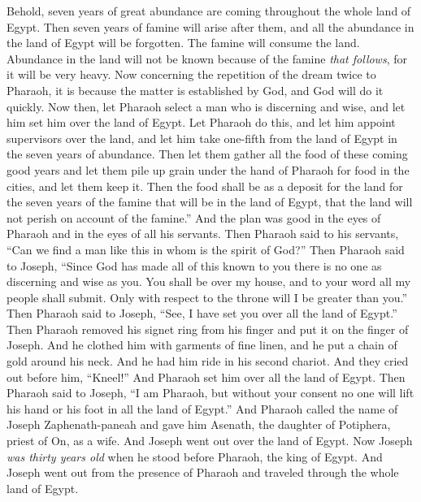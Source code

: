 \begin{biblechapter}
\verse Behold, seven years of great abundance are coming throughout the whole land of Egypt.
\verse Then seven years of famine will arise after them, and all the abundance in the land of Egypt will be forgotten. The famine will consume the land.
\verse Abundance in the land will not be known because of the famine \textit{that follows}, for it will be very heavy.
\verse Now concerning the repetition of the dream twice to Pharaoh, it is because the matter is established by God, and God will do it quickly.
\verse Now then, let Pharaoh select a man who is discerning and wise, and let him set him over the land of Egypt.
\verse Let Pharaoh do this, and let him appoint supervisors over the land, and let him take one-fifth from the land of Egypt in the seven years of abundance.
\verse Then let them gather all the food of these coming good years and let them pile up grain under the hand of Pharaoh for food in the cities, and let them keep it.
\verse Then the food shall be as a deposit for the land for the seven years of the famine that will be in the land of Egypt, that the land will not perish on account of the famine.”
 And the plan was good in the eyes of Pharaoh and in the eyes of all his servants.
\verse Then Pharaoh said to his servants, “Can we find a man like this in whom is the spirit of God?”
\verse Then Pharaoh said to Joseph, “Since God has made all of this known to you there is no one as discerning and wise as you.
\verse You shall be over my house, and to your word all my people shall submit. Only with respect to the throne will I be greater than you.”
\verse Then Pharaoh said to Joseph, “See, I have set you over all the land of Egypt.”
\verse Then Pharaoh removed his signet ring from his finger and put it on the finger of Joseph. And he clothed him with garments of fine linen, and he put a chain of gold around his neck.
\verse And he had him ride in his second chariot. And they cried out before him, “Kneel!” And Pharaoh set him over all the land of Egypt.
\verse Then Pharaoh said to Joseph, “I am Pharaoh, but without your consent no one will lift his hand or his foot in all the land of Egypt.”
\verse And Pharaoh called the name of Joseph Zaphenath-paneah and gave him Asenath, the daughter of Potiphera, priest of On, as a wife. And Joseph went out over the land of Egypt.
\verse Now Joseph \textit{was thirty years old} when he stood before Pharaoh, the king of Egypt. And Joseph went out from the presence of Pharaoh and traveled through the whole land of Egypt.

\end{biblechapter}
